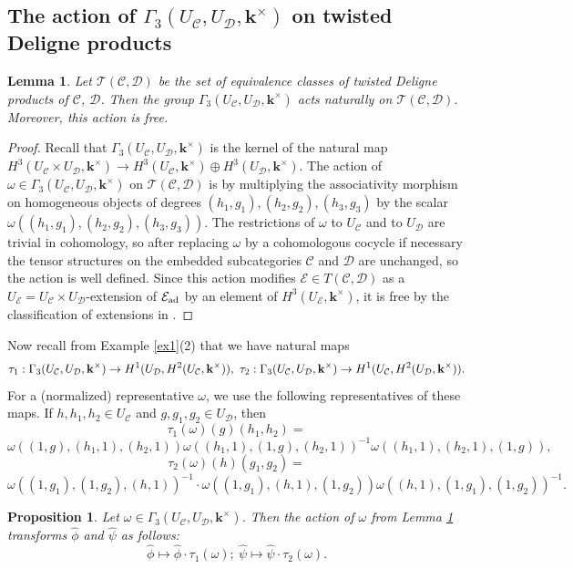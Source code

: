 \documentclass[12pt]{amsart}
\numberwithin{equation}{section}
\newtheorem{lemma}[theorem]{Lemma}
\newtheorem{proposition}[theorem]{Proposition}
\theoremstyle{definition}
\newcommand{\1}{_{(1)}}
\newcommand{\2}{_{(2)}}
\newcommand{\3}{_{(3)}}
\newcommand{\4}{_{(4)}}
\newcommand{\5}{_{(5)}}
\newcommand{\6}{_{(6)}}
\newcommand{\C}{\mathcal{C}}
\theoremstyle{plain}
\theoremstyle{definition}
\theoremstyle{remark}
\def\C{\mathcal{C}}
\def\D{\mathcal{D}}
\def\E{\mathcal{E}}
\def\k{\mathbf{k}}
\begin{document}
\subsection{The action of $\Gamma_3(U_\C,U_\D,\k^\times)$ on twisted Deligne products}

\begin{lemma}\label{act0} Let ${\mathcal T}(\C,\D)$ be the set of equivalence classes of twisted Deligne products of $\C$, $\D$. 
Then the group $\Gamma_3(U_\C,U_\D,\k^\times)$ acts naturally on ${\mathcal T}(\C,\D)$. Moreover, this action is free.
\end{lemma} 

\begin{proof} Recall that $\Gamma_3(U_\C,U_\D,\k^\times)$ 
is the kernel of the natural map $H^3(U_\C\times U_\D,\k^\times)\to H^3(U_\C,\k^\times)\oplus H^3(U_\D,\k^\times)$. The action of $\omega\in \Gamma_3(U_\C,U_\D,\k^\times)$ on ${\mathcal T}(\C,\D)$ is by multiplying the associativity morphism on homogeneous objects of degrees $(h_1,g_1),(h_2,g_2),(h_3,g_3)$ by the scalar $\omega((h_1,g_1),(h_2,g_2),(h_3,g_3))$. The restrictions of $\omega$ to $U_\C$ and to $U_\D$ are trivial in cohomology, so after replacing $\omega$ by a cohomologous cocycle if necessary the tensor structures on the embedded subcategories $\C$ and $\D$ are unchanged, so the action is well defined. Since this action modifies $\E\in T(\C,\D)$ as a $U_\E=U_\C\times U_\D$-extension of $\E_{\rm ad}$ by an element of $H^3(U_\E,\k^\times)$, it is free by the classification of extensions in \cite{ENO}. 
\end{proof} 

Now recall from Example \ref{ex1}(2) that we have natural maps \scriptsize
$$
\tau_1: \Gamma_3(U_\C,U_\D,\k^\times)\to H^1(U_\D,H^2(U_\C,\bold k^\times)),\ 
\tau_2: \Gamma_3(U_\C,U_\D,\k^\times)\to H^1(U_\C,H^2(U_\D,\bold k^\times)).
$$
\normalsize
For a (normalized) representative $\omega$, we use the following representatives of these maps.  If $h,h_1,h_2\in U_\C$ and $g,g_1,g_2\in U_\D$, then
$$
\tau_1(\omega)(g)(h_1,h_2)
=
$$
$$
\omega((1,g),(h_1,1),(h_2,1))\omega((h_1,1),(1,g),(h_2,1))^{-1}
 \omega((h_1,1),(h_2,1),(1,g)),
 $$
 $$
\tau_2(\omega)(h)(g_1,g_2)=
$$
$$
\omega((1,g_1),(1,g_2),(h,1))^{-1}\cdot \omega((1,g_1),(h,1),(1,g_2))
 \omega((h,1),(1,g_1),(1,g_2))^{-1}.
$$


\begin{proposition}\label{transfo}
Let $\omega\in \Gamma_3(U_\C,U_\D,\k^\times)$. Then 
the action of $\omega$ from Lemma \ref{act0} transforms $\widehat{\phi}$ and $\widehat{\psi}$ as follows: 
$$
\widehat{\phi}\mapsto \widehat{\phi}\cdot \tau_1(\omega);\ \widehat{\psi}\mapsto \widehat{\psi}\cdot \tau_2(\omega).
$$   
\end{proposition} 
\end{document}
